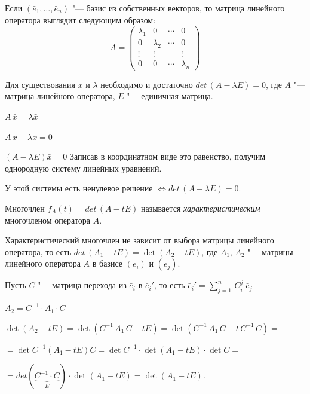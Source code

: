 Если $(\bar{e}_1, \ldots, \bar{e}_n)$ "--- базис из собственных векторов, то матрица линейного оператора выглядит следующим образом:
$$
  A = \begin{pmatrix}
    \lambda_1 & 0 & \cdots & 0 \\
    0 & \lambda_2 & \cdots & 0 \\
    \vdots & \vdots && \vdots \\
    0 & 0 & \cdots & \lambda_n
  \end{pmatrix}
$$
\begin{theorem}
  Для существования $\bar{x}$ и $\lambda$ необходимо и достаточно $det\, (A - \lambda E) = 0$, где $A$ "--- матрица линейного оператора, $E$ "--- единичная матрица.
\end{theorem}
\begin{Proof}
  $A\, \bar{x} = \lambda \bar{x}$

  $A\, \bar{x} - \lambda \bar{x} = 0$

  $(A - \lambda E)\bar{x} = 0$ Записав в координатном виде это равенство, получим однородную систему линейных уравнений.


  У этой системы есть ненулевое решение $\Leftrightarrow det\, (A - \lambda E) = 0$.
\end{Proof}

\begin{definition}
  Многочлен $f_A(t) = det\, (A - tE)$ называется \textit{характеристическим} многочленом оператора $A$.
\end{definition}

\begin{theorem}
  Характеристический многочлен не зависит от выбора матрицы линейного оператора, то есть $det\, (A_1 - tE) = \det (A_2 - tE)$, где $A_1, \, A_2$ "--- матрицы линейного оператора $A$ в базисе $(\bar{e}_i)$ и $(\bar{e}_j)$.
\end{theorem}
\begin{Proof}
  Пусть $C$ "--- матрица перехода из $\bar{e}_i$ в $\bar{e}_i'$, то есть $\bar{e}_i' = \sum\limits_{j = 1}^n \, C_i^j\; \bar{e}_j$

  $A_2 = C^{-1} \cdot A_1 \cdot C$

  $\det(A_2 - tE) = \det(C^{-1}\, A_1 \, C - tE) = \det(C^{-1}\, A_1\, C - t\, C^{-1}\, C) = $

  $= \det C^{-1}(A_1 - tE)C = \det C^{-1} \cdot \det (A_1 - tE) \cdot \det C = $

  $= det(\underbrace{C^{-1} \cdot C}_{E}) \cdot \det(A_1 - tE) = \det(A_1 - tE)$.  
\end{Proof}

